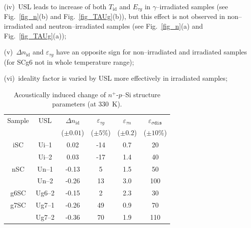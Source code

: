 \documentclass[aip,jap, amsmath,amssymb,reprint]{revtex4-1}
\begin{document}
\noindent
(iv)~USL leads to increase  of both $T_{\mathrm{id}}$ and $E_{\tau g}$ in $\gamma$--irradiated samples (see Fig.~\ref{fig_n}(b) and Fig.~\ref{fig_TAUg}(b)), 
but this effect is not observed in non--irradiated and neutron--irradiated samples (see Fig.~\ref{fig_n}(a) and Fig.~\ref{fig_TAUg}(a));

\noindent
(v)~$\Delta n_{\mathrm{id}}$ and $\varepsilon_{\tau g}$ have an opposite sign for non--irradiated and irradiated samples
(for SCg6 not in whole temperature range);

\noindent
(vi)~ideality factor is varied by USL more effectively in irradiated samples;


\begin{table}
\caption{\label{tabAIchange}Acoustically induced change of $n^+$-$p$--Si structure parameters (at 330~K).
}
\begin{ruledtabular}
\begin{tabular}{cccccc}
Sample&USL&$\Delta n_{\mathrm{id}}$ &$\varepsilon_{\tau g}$ &$\varepsilon_{\tau n}$ &$\varepsilon_{\sigma\mathtt{dis}}$ \\
&&\mbox{($\pm0.01$)}&($\pm5$\%)&($\pm0.2$)&($\pm10$\%)\\
\hline
iSC&Ui--1&0.02&-14&0.7&20\\
&Ui--2&0.03&-17&1.4&40\\
nSC&Un--1&-0.13&5&1.5&50\\
&Un--2&-0.26&13&3.0&100\\
g6SC&Ug6--2&-0.15&2&2.3&30\\
g7SC&Ug7--1&-0.26&49&0.9&70\\
&Ug7--2&-0.36&70&1.9&110\\
\end{tabular}
\end{ruledtabular}
\end{table}
\end{document}
